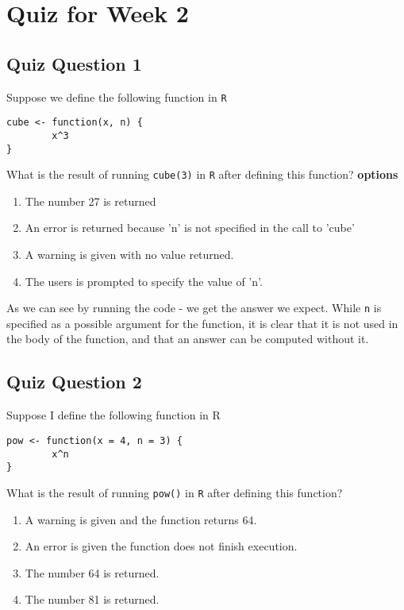 \documentclass[12pt]{article}
\begin{document}
\tableofcontents
\newpage
\section*{Quiz for Week 2}

\subsection*{Quiz Question 1}%
Suppose we define the following function in \texttt{R}
\begin{framed}
\begin{verbatim}
cube <- function(x, n) {
        x^3
}
\end{verbatim}
\end{framed}
What is the result of running
\texttt{cube(3)}
in \texttt{R} after defining this function?
\textbf{options}
\begin{enumerate}
\item The number 27 is returned
\item An error is returned because 'n' is not specified in the call to 'cube'
\item A warning is given with no value returned.
\item The users is prompted to specify the value of 'n'.
\end{enumerate}

As we can see by running the code - we get the answer we expect.
While \texttt{n} is specified as a possible argument for the function, it is clear that it is not used in the body of the function, and that an answer can be computed without it.

\newpage
\subsection*{Quiz Question 2}
Suppose I define the following function in R
\begin{framed}
\begin{verbatim}
pow <- function(x = 4, n = 3) {
        x^n
}
\end{verbatim}
\end{framed}
What is the result of running
\texttt{pow()}
in \texttt{R} after defining this function?
\begin{enumerate}
\item A warning is given and the function returns 64.
\item An error is given the function does not finish execution.
\item The number 64 is returned.
\item The number 81 is returned.
\end{enumerate}
\end{document}
